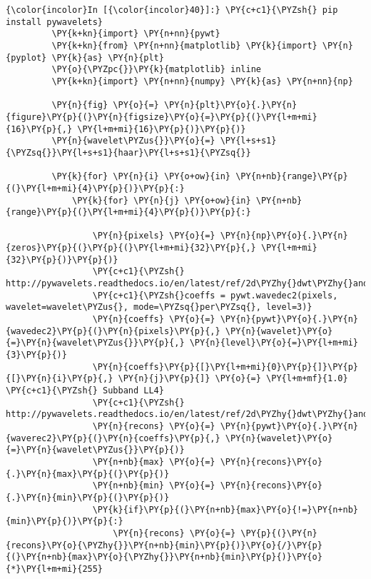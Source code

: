     \begin{Verbatim}[commandchars=\\\{\}]
{\color{incolor}In [{\color{incolor}40}]:} \PY{c+c1}{\PYZsh{} pip install pywavelets}
         \PY{k+kn}{import} \PY{n+nn}{pywt}
         \PY{k+kn}{from} \PY{n+nn}{matplotlib} \PY{k}{import} \PY{n}{pyplot} \PY{k}{as} \PY{n}{plt}
         \PY{o}{\PYZpc{}}\PY{k}{matplotlib} inline
         \PY{k+kn}{import} \PY{n+nn}{numpy} \PY{k}{as} \PY{n+nn}{np}
         
         \PY{n}{fig} \PY{o}{=} \PY{n}{plt}\PY{o}{.}\PY{n}{figure}\PY{p}{(}\PY{n}{figsize}\PY{o}{=}\PY{p}{(}\PY{l+m+mi}{16}\PY{p}{,} \PY{l+m+mi}{16}\PY{p}{)}\PY{p}{)}
         \PY{n}{wavelet\PYZus{}}\PY{o}{=} \PY{l+s+s1}{\PYZsq{}}\PY{l+s+s1}{haar}\PY{l+s+s1}{\PYZsq{}}
         
         \PY{k}{for} \PY{n}{i} \PY{o+ow}{in} \PY{n+nb}{range}\PY{p}{(}\PY{l+m+mi}{4}\PY{p}{)}\PY{p}{:}
             \PY{k}{for} \PY{n}{j} \PY{o+ow}{in} \PY{n+nb}{range}\PY{p}{(}\PY{l+m+mi}{4}\PY{p}{)}\PY{p}{:}
         
                 \PY{n}{pixels} \PY{o}{=} \PY{n}{np}\PY{o}{.}\PY{n}{zeros}\PY{p}{(}\PY{p}{(}\PY{l+m+mi}{32}\PY{p}{,} \PY{l+m+mi}{32}\PY{p}{)}\PY{p}{)}
                 \PY{c+c1}{\PYZsh{} http://pywavelets.readthedocs.io/en/latest/ref/2d\PYZhy{}dwt\PYZhy{}and\PYZhy{}idwt.html\PYZsh{}d\PYZhy{}multilevel\PYZhy{}decomposition\PYZhy{}using\PYZhy{}wavedec2}
                 \PY{c+c1}{\PYZsh{}coeffs = pywt.wavedec2(pixels, wavelet=wavelet\PYZus{}, mode=\PYZsq{}per\PYZsq{}, level=3)}
                 \PY{n}{coeffs} \PY{o}{=} \PY{n}{pywt}\PY{o}{.}\PY{n}{wavedec2}\PY{p}{(}\PY{n}{pixels}\PY{p}{,} \PY{n}{wavelet}\PY{o}{=}\PY{n}{wavelet\PYZus{}}\PY{p}{,} \PY{n}{level}\PY{o}{=}\PY{l+m+mi}{3}\PY{p}{)}
                 \PY{n}{coeffs}\PY{p}{[}\PY{l+m+mi}{0}\PY{p}{]}\PY{p}{[}\PY{n}{i}\PY{p}{,} \PY{n}{j}\PY{p}{]} \PY{o}{=} \PY{l+m+mf}{1.0} \PY{c+c1}{\PYZsh{} Subband LL4}
                 \PY{c+c1}{\PYZsh{} http://pywavelets.readthedocs.io/en/latest/ref/2d\PYZhy{}dwt\PYZhy{}and\PYZhy{}idwt.html\PYZsh{}d\PYZhy{}multilevel\PYZhy{}reconstruction\PYZhy{}using\PYZhy{}waverec2}
                 \PY{n}{recons} \PY{o}{=} \PY{n}{pywt}\PY{o}{.}\PY{n}{waverec2}\PY{p}{(}\PY{n}{coeffs}\PY{p}{,} \PY{n}{wavelet}\PY{o}{=}\PY{n}{wavelet\PYZus{}}\PY{p}{)}
                 \PY{n+nb}{max} \PY{o}{=} \PY{n}{recons}\PY{o}{.}\PY{n}{max}\PY{p}{(}\PY{p}{)}
                 \PY{n+nb}{min} \PY{o}{=} \PY{n}{recons}\PY{o}{.}\PY{n}{min}\PY{p}{(}\PY{p}{)}
                 \PY{k}{if}\PY{p}{(}\PY{n+nb}{max}\PY{o}{!=}\PY{n+nb}{min}\PY{p}{)}\PY{p}{:}
                     \PY{n}{recons} \PY{o}{=} \PY{p}{(}\PY{n}{recons}\PY{o}{\PYZhy{}}\PY{n+nb}{min}\PY{p}{)}\PY{o}{/}\PY{p}{(}\PY{n+nb}{max}\PY{o}{\PYZhy{}}\PY{n+nb}{min}\PY{p}{)}\PY{o}{*}\PY{l+m+mi}{255}
                     

\end{Verbatim}
